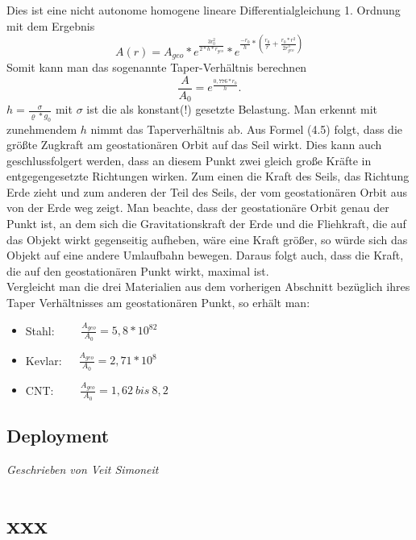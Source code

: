 \documentclass[a4paper, 10pt]{report}
\begin{document}
Dies ist eine nicht autonome homogene lineare Differentialgleichung 1. Ordnung mit dem Ergebnis
\begin{equation}
A(r)=A_{geo}*e^\frac{3r_0^2}{2*h*r_{geo}}*e^{\frac{-r_0}{h}*(\frac{r_0}{r}+\frac{r_0*r^2}{2r_{geo}^3})}
\end{equation}
Somit kann man das sogenannte Taper-Verhältnis berechnen
\begin{equation}
\frac{A}{A_0} = e^\frac{0,776*r_0}{h}.
\end{equation}
$h=\frac{\sigma}{\varrho*g_0}$ mit $\sigma$ ist die als konstant(!) gesetzte Belastung. Man erkennt mit zunehmendem $h$ nimmt das Taperverhältnis ab.
Aus Formel (4.5) folgt, dass die größte Zugkraft am geostationären Orbit auf das Seil wirkt. Dies kann auch geschlussfolgert werden, dass an diesem Punkt zwei gleich große Kräfte in entgegengesetzte Richtungen wirken. Zum einen die Kraft des Seils, das Richtung Erde zieht und zum anderen der Teil des Seils, der vom geostationären Orbit aus von der Erde weg zeigt. Man beachte, dass der geostationäre Orbit genau der Punkt ist, an dem sich die Gravitationskraft der Erde und die Fliehkraft, die auf das Objekt wirkt gegenseitig aufheben, wäre eine Kraft größer, so würde sich das Objekt auf eine andere Umlaufbahn bewegen. Daraus folgt auch, dass die Kraft, die auf den geostationären Punkt wirkt, maximal ist. \\
Vergleicht man die drei Materialien aus dem vorherigen Abschnitt bezüglich ihres Taper Verhältnisses am geostationären Punkt, so erhält man:

\begin{itemize}
\item Stahl: \ \ \ \ $\frac{A_{geo}}{A_0} = 5,8 *10^82$
\item Kevlar:\ \ \   $\frac{A_{geo}}{A_0} = 2,71 *10^8$
\item CNT: \ \ \ \ $\frac{A_{geo}}{A_0} = 1,62\ bis\ 8,2 $ 
\end{itemize}


\section{Deployment}
\textsl{Geschrieben von Veit Simoneit}\\

\appendix
\chapter{xxx}
\end{document}
